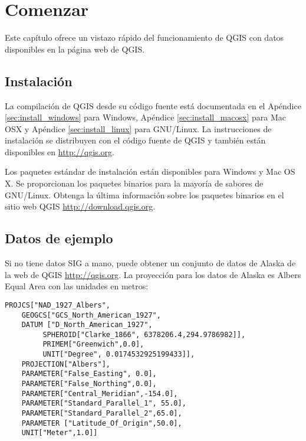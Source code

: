 \section{Comenzar}\label{label_getstarted}

Este capítulo ofrece un vistazo rápido del funcionamiento de QGIS con datos disponibles 
en la página web de QGIS.

\subsection{Instalación}\label{label_installation}

La compilación de QGIS desde su código fuente está documentada en el Apéndice \ref{sec:install_windows} para Windows, Apéndice \ref{sec:install_macosx} para Mac OSX y Apéndice \ref{sec:install_linux} para GNU/Linux. 
La instrucciones de instalación se distribuyen con el código fuente de QGIS y
también están disponibles en \url{http://qgis.org}. 

Los paquetes estándar de instalación están disponibles para Windows y Mac OS X. 
Se proporcionan los paquetes binarios para la mayoría de sabores de GNU/Linux. 
Obtenga la última información sobre los paquetes binarios en el sitio web QGIS
 \url{http://download.qgis.org}.

\subsection{Datos de ejemplo}\label{label_sampledata}

Si no tiene datos SIG a mano, puede obtener un conjunto de datos de Alaska
de la web de QGIS \url{http://qgis.org}. La proyección para los datos de Alaska
es Albers Equal Area con las unidades en metros:

\begin{verbatim}
PROJCS["NAD_1927_Albers",
    GEOGCS["GCS_North_American_1927",
	DATUM ["D_North_American_1927",
	     SPHEROID["Clarke_1866", 6378206.4,294.9786982]],
	     PRIMEM["Greenwich",0.0],
	     UNIT["Degree", 0.0174532925199433]],
    PROJECTION["Albers"],
    PARAMETER["False_Easting", 0.0],
    PARAMETER["False_Northing",0.0],
    PARAMETER["Central_Meridian",-154.0],
    PARAMETER["Standard_Parallel_1", 55.0],
    PARAMETER["Standard_Parallel_2",65.0],
    PARAMETER ["Latitude_Of_Origin",50.0],
    UNIT["Meter",1.0]]
\end{verbatim}

